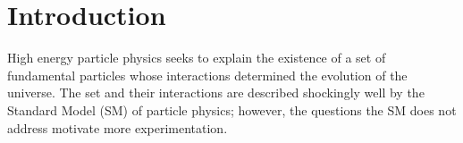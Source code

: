 
\chapter{Introduction}
\label{chap:intro}



High energy particle physics seeks to explain the existence of a set of fundamental particles whose interactions determined the evolution of the universe. The set and their interactions are described shockingly well by the Standard Model (SM) of particle physics; however, the questions the SM does not address motivate more experimentation. 

